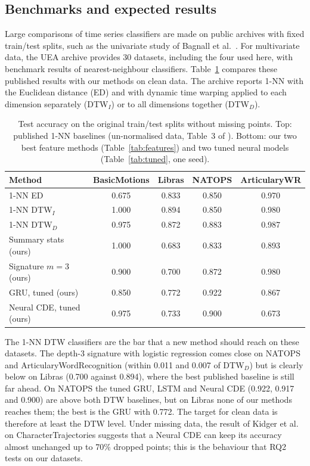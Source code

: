 \subsection{Benchmarks and expected results}

Large comparisons of time series classifiers are made on public
archives with fixed train/test splits, such as the univariate study of
Bagnall et al.\ \cite{bagnall2017bakeoff}. For multivariate data, the UEA
archive \cite{bagnall2018uea} provides 30 datasets, including the four
used here, with benchmark results of nearest-neighbour classifiers.
Table~\ref{tab:published} compares these published results with our
methods on clean data. The archive reports 1-NN with the
Euclidean distance (ED) and with dynamic time warping applied to each
dimension separately (DTW$_I$) or to all dimensions together (DTW$_D$).

\begin{table}[ht]
\centering
\caption{Test accuracy on the original train/test splits without missing
points. Top: published 1-NN baselines (un-normalised data, Table~3 of
\cite{bagnall2018uea}). Bottom: our two best feature methods
(Table~\ref{tab:features}) and two tuned neural models
(Table~\ref{tab:tuned}, one seed).}
\label{tab:published}
\begin{tabular}{lcccc}
\toprule
Method & BasicMotions & Libras & NATOPS & ArticularyWR \\
\midrule
1-NN ED \cite{bagnall2018uea} & 0.675 & 0.833 & 0.850 & 0.970 \\
1-NN DTW$_I$ \cite{bagnall2018uea} & 1.000 & 0.894 & 0.850 & 0.980 \\
1-NN DTW$_D$ \cite{bagnall2018uea} & 0.975 & 0.872 & 0.883 & 0.987 \\
\midrule
Summary stats (ours) & 1.000 & 0.683 & 0.833 & 0.893 \\
Signature $m = 3$ (ours) & 0.900 & 0.700 & 0.872 & 0.980 \\
GRU, tuned (ours) & 0.850 & 0.772 & 0.922 & 0.867 \\
Neural CDE, tuned (ours) & 0.975 & 0.733 & 0.900 & 0.673 \\
\bottomrule
\end{tabular}
\end{table}

The 1-NN DTW classifiers are the bar that a new method should reach on
these datasets. The depth-3 signature with logistic regression comes
close on NATOPS and ArticularyWordRecognition (within 0.011 and 0.007 of
DTW$_D$) but is clearly below on Libras (0.700 against 0.894), where the
best published baseline is still far ahead. On NATOPS the tuned GRU,
LSTM and Neural CDE (0.922, 0.917 and 0.900) are above both DTW
baselines, but on Libras none of our methods reaches them; the best is the
GRU with 0.772. The target for clean data is therefore at least the DTW
level.
Under missing data, the result of Kidger et al.\ \cite{kidger2020ncde} on
CharacterTrajectories suggests that a Neural CDE can keep its accuracy
almost unchanged up to 70\% dropped points; this is the behaviour that
RQ2 tests on our datasets.
